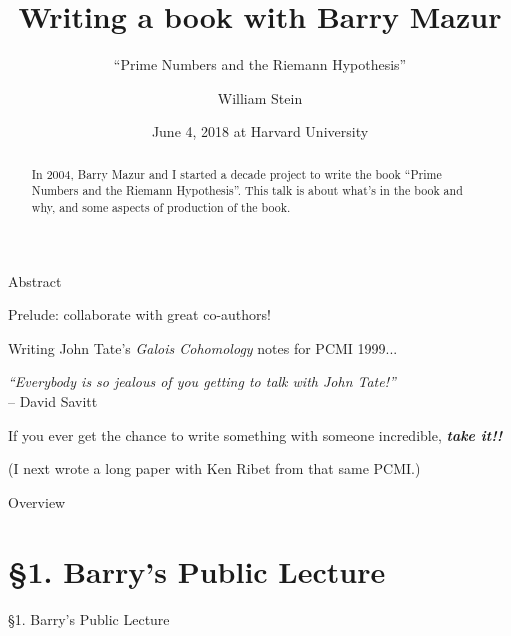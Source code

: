\documentclass{beamer}
\title{Writing a book with Barry Mazur}
\subtitle{``Prime Numbers and the Riemann Hypothesis''}
\author[W.\thinspace{}Stein]{William Stein}
\date[Mazur 80]{June 4, 2018 at Harvard University}
\institute[SageMath, Inc. \& UW]{SageMath, Inc. and University of Washington}
\newcommand{\mysection}[2]{\section{\S#1. #2}%
\begin{frame}{}
\vfill
\begin{center}
\hrulefill
\vfill
\Huge\sc \S#1. #2
\vfill
\hrulefill
\end{center}
\vfill
\end{frame}}
\begin{document}
\begin{frame}
  \titlepage
\end{frame}

\begin{frame}{Abstract}
  \begin{abstract}
    In 2004, Barry Mazur and I started a decade project to write the
    book ``Prime Numbers and the Riemann Hypothesis''.
    This talk is about
    what's in the book and why, and some aspects
    of production of the book.
  \end{abstract}
\end{frame}

\begin{frame}{Prelude: collaborate with great co-authors!}

Writing John Tate's {\em Galois Cohomology} notes for PCMI 1999...

\vfill

\begin{block}{}
{\em
``Everybody is so jealous of you getting
to talk with John Tate!''}\\
 -- David Savitt
  \end{block}

\vfill

If you ever get the chance
to write something with someone incredible,
{\bf\em take it!!}

\vfill

(I next wrote a long paper with Ken Ribet from that same PCMI.)

\end{frame}


\begin{frame}{Overview}
  \tableofcontents
\end{frame}

\mysection{1}{Barry's Public Lecture}
\end{document}
